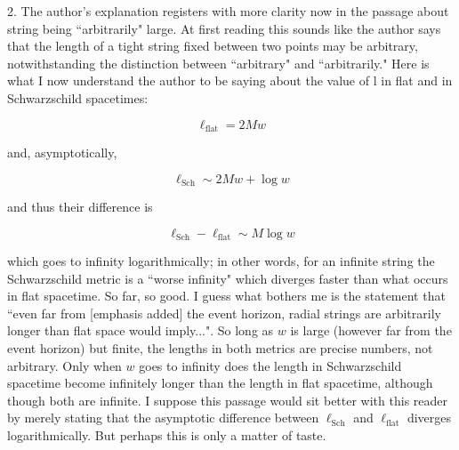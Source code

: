 \documentclass[12pt]{article}
\begin{document}
2. The author's explanation registers with more clarity now in the
passage about string being ``arbitrarily" large.  At first reading
this sounds like the author says that the length of a tight string
fixed between two points may be arbitrary, notwithstanding the
distinction between ``arbitrary" and ``arbitrarily."  Here is what I
now understand the author to be saying about the value of l in flat
and in Schwarzschild spacetimes:

\[
\ell_\mathrm{flat} = 2Mw
\]

and, asymptotically,

\[
\ell_\mathrm{Sch}\sim 2Mw + \log w
\]

and thus their difference is

\[
\ell_\mathrm{Sch} - \ell_\mathrm{flat}\sim M\log w
\]

which goes to infinity logarithmically; in other words, for an
infinite string the Schwarzschild metric is a ``worse infinity" which
diverges faster than what occurs in flat spacetime.  So far, so good.
I guess what bothers me is the statement that ``even far from [emphasis
  added] the event horizon, radial strings are arbitrarily longer than
flat space would imply...".  So long as $w$ is large (however far from
the event horizon) but finite, the lengths in both metrics are precise
numbers, not arbitrary.  Only when $w$ goes to infinity does the
length in Schwarzschild spacetime become infinitely longer than the
length in flat spacetime, although though both are infinite.  I
suppose this passage would sit better with this reader by merely
stating that the asymptotic difference between $\ell_\mathrm{Sch}$ and
$\ell_\mathrm{flat}$ diverges logarithmically.  But perhaps this is
only a matter of taste.
\end{document}
